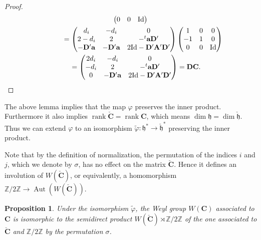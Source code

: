 \documentclass[pdftex]{sigma}
\numberwithin{equation}{section}
\newtheorem{Proposition}[Theorem]{Proposition}
\theoremstyle{definition}
\newcommand{\Z}{\mathbb{Z}} %
\newcommand{\h}{\mathfrak{h}} %
\newcommand{\Aut}{\operatorname{Aut}}
\newcommand{\rank}{\operatorname{rank}}
\newcommand{\unit}{\mathrm{Id}}
\newcommand{\bA}{\mathbf{A}} %
\newcommand{\bD}{\mathbf{D}} %
\newcommand{\bC}{\mathbf{C}} %
\begin{document}
\begin{proof}
\begin{gather*}
\begin{pmatrix}
0  & 0 & \unit
\end{pmatrix} \\
\hphantom{{}^t \varphi \check{\bD} \check{\bC} \varphi}{}
=
\begin{pmatrix}
d_i & -d_i & 0 \\
2-d_i & 2 & -{}^t \mathbf{a}\bD' \\
-\bD'\mathbf{a} & -\bD'\mathbf{a} & 2\unit -\bD'\bA'\bD'
\end{pmatrix}
\begin{pmatrix}
1  & 0 & 0 \\
-1 & 1 & 0 \\
0  & 0 & \unit
\end{pmatrix} \\
\hphantom{{}^t \varphi \check{\bD} \check{\bC} \varphi}{}
=
\begin{pmatrix}
2d_i & -d_i & 0 \\
-d_i & 2 & -{}^t \mathbf{a}\bD' \\
0 & -\bD'\mathbf{a} & 2\unit -\bD'\bA'\bD'
\end{pmatrix}
= \bD \bC.\tag*{\qed}
\end{gather*}
\renewcommand{\qed}{}
\end{proof}

The above lemma implies that the map $\varphi$ preserves the inner product.
Furthermore it also implies $\rank \check{\bC} = \rank \bC$,
which means $\dim \h = \dim \check{\h}$.
Thus we can extend $\varphi$ to an isomorphism
$\tilde{\varphi} \colon \h^* \to \check{\h}^*$ preserving the inner product.

Note that by the def\/inition of normalization,
the permutation of the indices $i$ and $j$,
which we denote by $\sigma$,
has no ef\/fect on the matrix $\check{\bC}$.
Hence it def\/ines an involution of $W(\check{\bC})$,
or equivalently, a homomorphism $\Z/2\Z \to \Aut(W(\check{\bC}))$.

\begin{Proposition}\label{prop:weyl}
Under the isomorphism $\tilde{\varphi}$,
the Weyl group $W(\bC)$ associated to $\bC$ is
isomorphic to the semidirect product $W(\check{\bC}) \rtimes \Z/2\Z$
of the one associated to $\check{\bC}$ and $\Z/2\Z$
by the permutation $\sigma$.
\end{Proposition}
\end{document}
